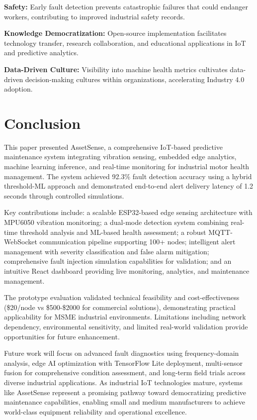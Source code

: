 \documentclass[conference]{IEEEtran}
\begin{document}
\textbf{Safety:} Early fault detection prevents catastrophic failures that could endanger workers, contributing to improved industrial safety records.

\textbf{Knowledge Democratization:} Open-source implementation facilitates technology transfer, research collaboration, and educational applications in IoT and predictive analytics.

\textbf{Data-Driven Culture:} Visibility into machine health metrics cultivates data-driven decision-making cultures within organizations, accelerating Industry 4.0 adoption.

\section{Conclusion}

This paper presented AssetSense, a comprehensive IoT-based predictive maintenance system integrating vibration sensing, embedded edge analytics, machine learning inference, and real-time monitoring for industrial motor health management. The system achieved 92.3\% fault detection accuracy using a hybrid threshold-ML approach and demonstrated end-to-end alert delivery latency of 1.2 seconds through controlled simulations.

Key contributions include: a scalable ESP32-based edge sensing architecture with MPU6050 vibration monitoring; a dual-mode detection system combining real-time threshold analysis and ML-based health assessment; a robust MQTT-WebSocket communication pipeline supporting 100+ nodes; intelligent alert management with severity classification and false alarm mitigation; comprehensive fault injection simulation capabilities for validation; and an intuitive React dashboard providing live monitoring, analytics, and maintenance management.

The prototype evaluation validated technical feasibility and cost-effectiveness (\$20/node vs \$500-\$2000 for commercial solutions), demonstrating practical applicability for MSME industrial environments. Limitations including network dependency, environmental sensitivity, and limited real-world validation provide opportunities for future enhancement.

Future work will focus on advanced fault diagnostics using frequency-domain analysis, edge AI optimization with TensorFlow Lite deployment, multi-sensor fusion for comprehensive condition assessment, and long-term field trials across diverse industrial applications. As industrial IoT technologies mature, systems like AssetSense represent a promising pathway toward democratizing predictive maintenance capabilities, enabling small and medium manufacturers to achieve world-class equipment reliability and operational excellence.
\end{document}
